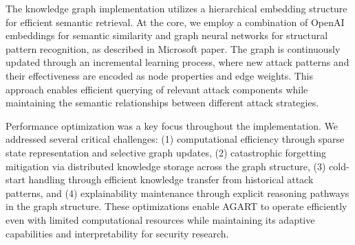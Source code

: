 The knowledge graph implementation utilizes a hierarchical embedding structure for efficient semantic retrieval. At the core, we employ a combination of OpenAI embeddings for semantic similarity and graph neural networks for structural pattern recognition, as described in Microsoft paper. The graph is continuously updated through an incremental learning process, where new attack patterns and their effectiveness are encoded as node properties and edge weights. This approach enables efficient querying of relevant attack components while maintaining the semantic relationships between different attack strategies.

Performance optimization was a key focus throughout the implementation. We addressed several critical challenges: (1) computational efficiency through sparse state representation and selective graph updates, (2) catastrophic forgetting mitigation via distributed knowledge storage across the graph structure, (3) cold-start handling through efficient knowledge transfer from historical attack patterns, and (4) explainability maintenance through explicit reasoning pathways in the graph structure. These optimizations enable AGART to operate efficiently even with limited computational resources while maintaining its adaptive capabilities and interpretability for security research.
